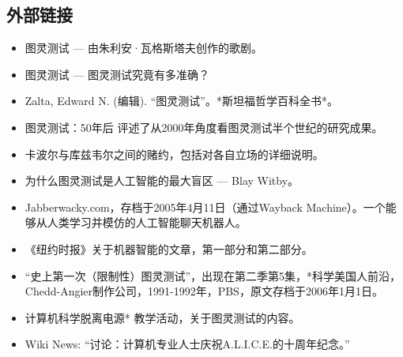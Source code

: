 \subsection{外部链接}
\begin{itemize}
\item 图灵测试 — 由朱利安·瓦格斯塔夫创作的歌剧。
\item 图灵测试 — 图灵测试究竟有多准确？
\item Zalta, Edward N. (编辑). “图灵测试”。*斯坦福哲学百科全书*。
\item 图灵测试：50年后 评述了从2000年角度看图灵测试半个世纪的研究成果。
\item 卡波尔与库兹韦尔之间的赌约，包括对各自立场的详细说明。
\item 为什么图灵测试是人工智能的最大盲区 — Blay Witby。
\item Jabberwacky.com，存档于2005年4月11日（通过Wayback Machine）。一个能够从人类学习并模仿的人工智能聊天机器人。
\item 《纽约时报》关于机器智能的文章，第一部分和第二部分。
\item “史上第一次（限制性）图灵测试”，出现在第二季第5集，*科学美国人前沿，Chedd-Angier制作公司，1991-1992年，PBS，原文存档于2006年1月1日。
\item 计算机科学脱离电源* 教学活动，关于图灵测试的内容。
\item Wiki News: “讨论：计算机专业人士庆祝A.L.I.C.E.的十周年纪念。”
\end{itemize}